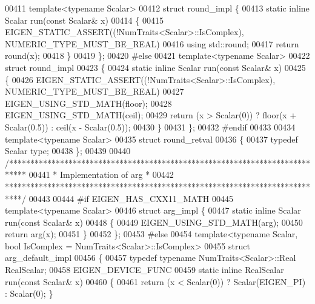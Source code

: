 \begin{DoxyCode}
00411   \textcolor{keyword}{template}<\textcolor{keyword}{typename} Scalar>
00412   \textcolor{keyword}{struct }round\_impl \{
00413     \textcolor{keyword}{static} \textcolor{keyword}{inline} Scalar run(\textcolor{keyword}{const} Scalar& x)
00414     \{
00415       EIGEN\_STATIC\_ASSERT((!NumTraits<Scalar>::IsComplex), NUMERIC\_TYPE\_MUST\_BE\_REAL)
00416       \textcolor{keyword}{using} std::round;
00417       \textcolor{keywordflow}{return} round(x);
00418     \}
00419   \};
00420 \textcolor{preprocessor}{#else}
00421   \textcolor{keyword}{template}<\textcolor{keyword}{typename} Scalar>
00422   \textcolor{keyword}{struct }round\_impl
00423   \{
00424     \textcolor{keyword}{static} \textcolor{keyword}{inline} Scalar run(\textcolor{keyword}{const} Scalar& x)
00425     \{
00426       EIGEN\_STATIC\_ASSERT((!NumTraits<Scalar>::IsComplex), NUMERIC\_TYPE\_MUST\_BE\_REAL)
00427       EIGEN\_USING\_STD\_MATH(floor);
00428       EIGEN\_USING\_STD\_MATH(ceil);
00429       \textcolor{keywordflow}{return} (x > Scalar(0)) ? floor(x + Scalar(0.5)) : ceil(x - Scalar(0.5));
00430     \}
00431   \};
00432 \textcolor{preprocessor}{#endif}
00433 
00434 \textcolor{keyword}{template}<\textcolor{keyword}{typename} Scalar>
00435 \textcolor{keyword}{struct }round\_retval
00436 \{
00437   \textcolor{keyword}{typedef} Scalar type;
00438 \};
00439 
00440 \textcolor{comment}{/****************************************************************************}
00441 \textcolor{comment}{* Implementation of arg                                                     *}
00442 \textcolor{comment}{****************************************************************************/}
00443 
00444 \textcolor{preprocessor}{#if EIGEN\_HAS\_CXX11\_MATH}
00445   \textcolor{keyword}{template}<\textcolor{keyword}{typename} Scalar>
00446   \textcolor{keyword}{struct }arg\_impl \{
00447     \textcolor{keyword}{static} \textcolor{keyword}{inline} Scalar run(\textcolor{keyword}{const} Scalar& x)
00448     \{
00449       EIGEN\_USING\_STD\_MATH(arg);
00450       \textcolor{keywordflow}{return} arg(x);
00451     \}
00452   \};
00453 \textcolor{preprocessor}{#else}
00454   template<typename Scalar, bool IsComplex = NumTraits<Scalar>::IsComplex>
00455   \textcolor{keyword}{struct }arg\_default\_impl
00456   \{
00457     \textcolor{keyword}{typedef} \textcolor{keyword}{typename} NumTraits<Scalar>::Real RealScalar;
00458     EIGEN\_DEVICE\_FUNC
00459     \textcolor{keyword}{static} \textcolor{keyword}{inline} RealScalar run(\textcolor{keyword}{const} Scalar& x)
00460     \{
00461       \textcolor{keywordflow}{return} (x < Scalar(0)) ? Scalar(EIGEN\_PI) : Scalar(0); \}

\end{DoxyCode}
